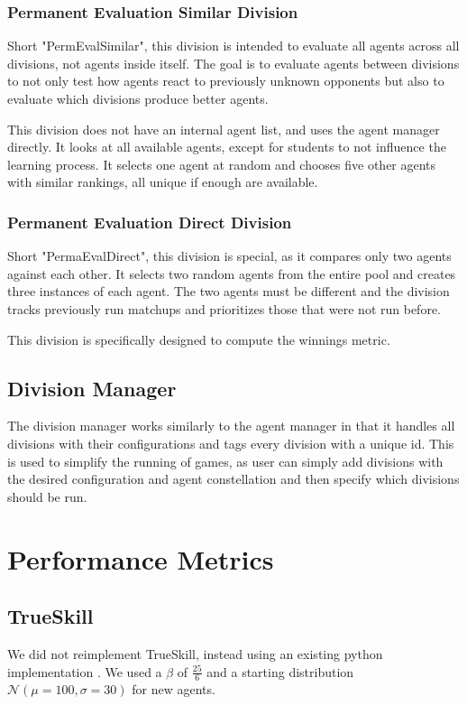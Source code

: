 \subsubsection{Permanent Evaluation Similar Division}\label{PermEvalSimilarDiv}
Short "PermEvalSimilar", this division is intended to evaluate all agents across all divisions, not agents inside itself. The goal is to evaluate agents between divisions to not only test how agents react to previously unknown opponents but also to evaluate which divisions produce better agents.

This division does not have an internal agent list, and uses the agent manager directly. It looks at all available agents, except for students to not influence the learning process. It selects one agent at random and chooses five other agents with similar rankings, all unique if enough are available.

\subsubsection{Permanent Evaluation Direct Division}\label{PermEvaldirectDiv}
Short "PermaEvalDirect", this division is special, as it compares only two agents against each other. It selects two random agents from the entire pool and creates three instances of each agent. The two agents must be different and the division tracks previously run matchups and prioritizes those that were not run before.

This division is specifically designed to compute the winnings  metric.

\subsection{Division Manager}
The division manager works similarly to the agent manager in that it handles all divisions with their configurations and tags every division with a unique id. This is used to simplify the running of games, as user can simply add divisions with the desired configuration and agent constellation and then specify which divisions should be run.

\section{Performance Metrics}\label{PerformanceMetricsSection}

\subsection{TrueSkill}
We did not reimplement TrueSkill, instead using an existing python implementation \cite{TrueSkill_code}. We used a $\beta$ of $\frac{25}{6}$ and a starting distribution $\mathcal{N}(\mu=100, \sigma=30)$ for new agents.

